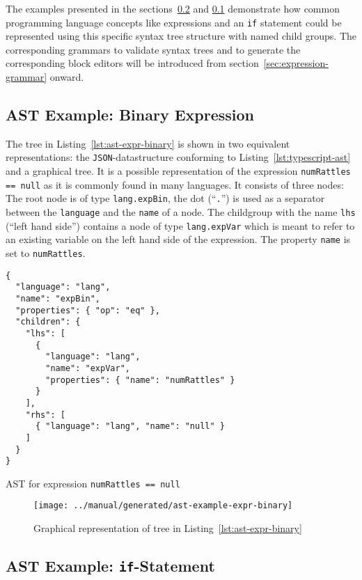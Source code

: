 \documentclass[sigconf,natbib=false,review=true,anonymous]{acmart}
\newcommand\astScale{0.7}
\begin{document}
The examples presented in the sections~\ref{sec:ast-example-if} and \ref{sec:ast-example-expr} demonstrate how common programming language concepts like expressions and an \texttt{if} statement could be represented using this specific syntax tree structure with named child groups. The corresponding grammars to validate syntax trees and to generate the corresponding block editors will be introduced from section~\ref{sec:expression-grammar} onward.

\subsection{AST Example: Binary Expression}
\label{sec:ast-example-expr}
The tree in Listing~\ref{lst:ast-expr-binary} is shown in two equivalent representations: the \texttt{JSON}-datastructure conforming to Listing~\ref{lst:typescript-ast} and a graphical tree. It is a possible representation of the expression \texttt{numRattles == null} as it is commonly found in many languages. It consists of three nodes: The root node is of type \texttt{lang.expBin}, the dot (\enquote{\texttt{.}}) is used as a separator between the \texttt{language} and the \texttt{name} of a node. The childgroup with the name \texttt{lhs} (\enquote{left hand side}) contains a node of type \texttt{lang.expVar} which is meant to refer to an existing variable on the left hand side of the expression. The property \texttt{name} is set to \texttt{numRattles}.

\begin{listing}[H]
\begin{verbatim}
{
  "language": "lang",
  "name": "expBin",
  "properties": { "op": "eq" },
  "children": {
    "lhs": [
      {
        "language": "lang",
        "name": "expVar",
        "properties": { "name": "numRattles" }
      }
    ],
    "rhs": [
      { "language": "lang", "name": "null" }
    ]
  }
}
\end{verbatim}
\caption{AST for expression \texttt{numRattles == null}}
\label{lst:ast-expr-binary}
\end{listing}

\begin{figure}
  \texttt{[image: ../manual/generated/ast-example-expr-binary]}
  \caption{Graphical representation of tree in Listing~\ref{lst:ast-expr-binary}}
  \label{fig:ast-expr-binary}
\end{figure}


\subsection{AST Example: \texttt{if}-Statement}
\label{sec:ast-example-if}
\end{document}
